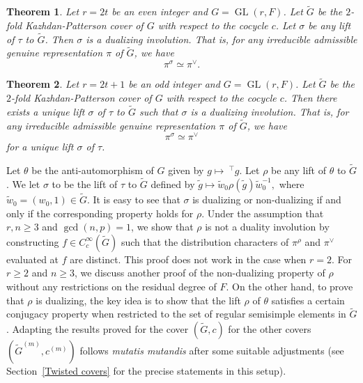 \documentclass[11pt, a4paper, reqno]{amsart}
\newtheorem{theorem}{Theorem}[section]
\theoremstyle{definition}
\theoremstyle{remark}
\theoremstyle{example}
\theoremstyle{note}
\numberwithin{equation}{section}
\DeclareMathOperator{\GL}{GL}
\begin{document}
\begin{theorem}\label{duality for even rank case}
Let $r =2t$ be an even integer and $G = \GL(r,F)$. Let $\widetilde{G}$ be the $2$-fold Kazhdan-Patterson cover of $G$ with respect to the cocycle $c$. Let $\sigma$ be any lift of $\tau$ to $\widetilde{G}$. Then $\sigma$ is a dualizing involution. That is, for any irreducible admissible genuine representation $\pi$ of $\widetilde{G}$, we have
\[\pi^{\sigma}\simeq \pi^{\vee}. \]
\end{theorem}



\begin{theorem}\label{unique duality for odd rank case}
Let $r =2t+1$ be an odd integer and $G = \GL(r,F)$. Let $\widetilde{G}$ be the $2$-fold Kazhdan-Patterson cover of $G$ with respect to the cocycle $c$. Then there exists a unique lift $\sigma$  of $\tau$ to $\widetilde{G}$ such that $\sigma$ is a dualizing involution. That is, for any irreducible admissible genuine representation $\pi$ of $\widetilde{G}$, we have 
\[\pi^{\sigma}\simeq \pi^{\vee}\]
for a unique lift $\sigma$ of $\tau$. 
\end{theorem}


Let $\theta$ be the anti-automorphism of $G$ given by $g\mapsto ~^{\top}g$. Let $\rho$ be any lift of $\theta$ to $\widetilde{G}$. 
We let $\sigma$ to be the lift of $\tau$ to $\widetilde{G}$ defined by $\tilde{g}\mapsto \tilde{w}_{0} \rho(\tilde{g}) \tilde{w}_{0}^{-1},$ where $\tilde{w}_{0}=(w_{0},1)\in \widetilde{G}$. It is easy to see that $\sigma$ is dualizing or non-dualizing if and only if the corresponding property holds for $\rho$. Under the assumption that $r, n\geq 3$ and $\gcd(n,p)=1$, we show that $\rho$ is not a duality involution by constructing $f\in C_{c}^{\infty}(\widetilde{G})$ such that the distribution characters of $\pi^{\rho}$ and $\pi^{\vee}$ evaluated at $f$ are distinct. This proof does not work in the case when $r=2$. For $r\geq 2$ and $n\geq 3$, we discuss another proof of the non-dualizing property of $\rho$ without any restrictions on the residual degree of $F$. On the other hand, to prove that $\rho$ is dualizing, the key idea is to show that the lift $\rho$ of $\theta$ satisfies a certain conjugacy property when restricted to the set of regular semisimple elements in $\widetilde{G}$. Adapting the results proved for the cover $(\widetilde{G},c)$ for the other covers $(\widetilde{G}^{(m)}, c^{(m)})$ follows \textit{mutatis mutandis} after some suitable adjustments (see Section~\ref{Twisted covers} for the precise statements in this setup). \\
\end{document}
